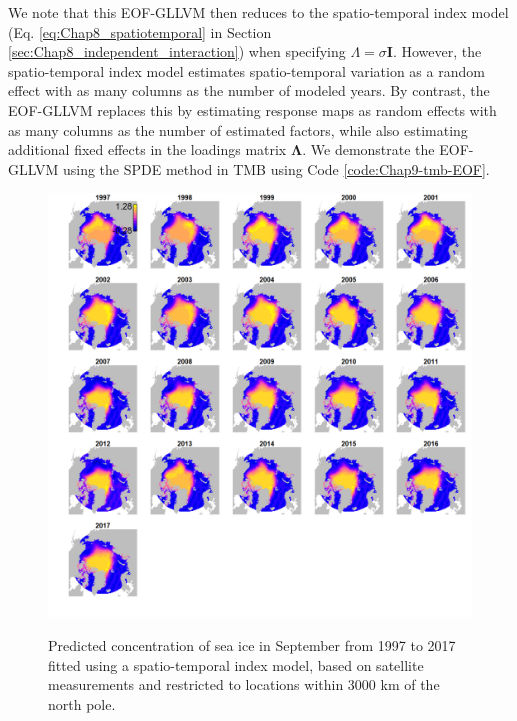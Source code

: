 We note that this EOF-GLLVM then reduces to the spatio-temporal index model (Eq. \ref{eq:Chap8_spatiotemporal} in Section \ref{sec:Chap8_independent_interaction}) when specifying \( \Lambda = \sigma \mathbf{I}\).  However, the spatio-temporal index model estimates spatio-temporal variation as a random effect with as many columns as the number of modeled years.  By contrast, the EOF-GLLVM replaces this by estimating response maps as random effects with as many columns as the number of estimated factors, while also estimating additional fixed effects in the loadings matrix \(\mathbf{\Lambda}\).  We demonstrate the EOF-GLLVM using the SPDE method in TMB using Code \ref{code:Chap9-tmb-EOF}. 

\lstset{style=TMBcode}


\begin{figure}[!ht]
    \caption[Arctic summer sea ice concentrations]{Predicted concentration of sea ice in September from 1997 to 2017 fitted using a spatio-temporal index model, based on satellite measurements and restricted to locations within 3000 km of the north pole.}
    \includegraphics[width=5.5in]{Chap_9/sea_ice_full.png}
    \label{fig:Chap9_sea_ice_full}
\end{figure}

